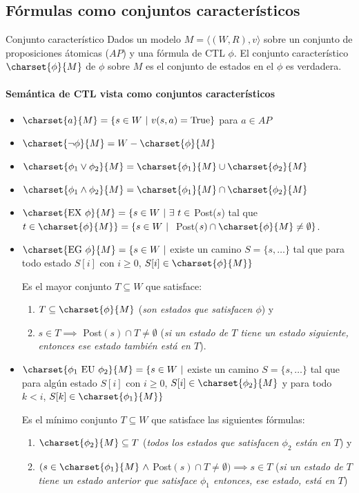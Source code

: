 \subsection{Fórmulas como conjuntos característicos}
\begin{definicion}{Conjunto característico}
Dados un modelo $M = \langle(W,R), v\rangle$ sobre un conjunto de proposiciones átomicas ($AP$) y una fórmula de CTL $\phi$. El conjunto característico $\charset{\phi}{M}$ de $\phi$ sobre $M$ es el conjunto de estados en el $\phi$ es verdadera.
\end{definicion}


\paragraph{Semántica de CTL vista como conjuntos característicos}
\begin{itemize}
\item $\charset{a}{M} = \{s \in W ~|~ v(s,a) = \text{True} \}$ para $a\in AP$
\item $\charset{\lnot\phi}{M} = W - \charset{\phi}{M}$
\item $\charset{\phi_1\lor\phi_2}{M} = \charset{\phi_1}{M} \cup \charset{\phi_2}{M}$
\item $\charset{\phi_1\land\phi_2}{M} = \charset{\phi_1}{M} \cap \charset{\phi_2}{M}$
\item $\charset{\text{EX }\phi}{M} = \{s\in W~|~\exists~t\in$ Post($s$) tal que $t\in\charset{\phi}{M}\} = \{ s \in W~|~$ Post($s) \cap \charset{\phi}{M} \neq\emptyset\}$.
\item $\charset{\text{EG }\phi}{M} = \{s\in W~|$ existe un camino $S=\{s,\dots\}$ tal que para todo estado $S[i]$ con $i\geq 0$, $S[i]\in\charset{\phi}{M} \}$

Es el mayor conjunto $T\subseteq W$ que satisface:
\begin{enumerate}
\item $T\subseteq\charset{\phi}{M}$ (\textit{son estados que satisfacen $\phi$}) y
\item $s\in T \implies$ Post$(s)\cap T \neq\emptyset$ (\textit{si un estado de $T$ tiene un estado siguiente, entonces ese estado también está en $T$}).
\end{enumerate}

\item $\charset{\phi_1 \text{ EU }\phi_2}{M} = \{s\in W~|$ existe un camino $S=\{s,\dots\}$ tal que para algún estado $S[i]$ con $i\geq 0$, $S[i]\in\charset{\phi_2}{M}$ y para todo $k < i$, $S[k]\in\charset{\phi_1}{M} \}$

Es el mínimo conjunto $T\subseteq W$ que satisface las siguientes fórmulas:
\begin{enumerate}
	\item $\charset{\phi_2}{M}\subseteq T$ (\textit{todos los estados que satisfacen $\phi_2$ están en $T$}) y
	\item $(s\in\charset{\phi_1}{M}~\land$ Post$(s)\cap T \neq\emptyset) \implies s\in T$ (\textit{si un estado de $T$ tiene un estado anterior que satisface $\phi_1$ entonces, ese estado, está en $T$})
\end{enumerate}
\end{itemize}

